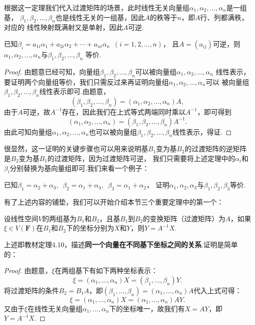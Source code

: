 根据这一定理我们代入过渡矩阵的场景，此时线性无关向量组$\alpha_1,\alpha_2,\ldots,\alpha_n$是一组基，
$\beta_1,\beta_2,\ldots,\beta_n$也是线性无关的一组基，因此$A$的秩等于$n$，即$A$行、列都满秩，对应的
线性映射既满射又是单射，因此$A$可逆.
\begin{theorem}
    已知$\beta_i=a_{1i}\alpha_1+a_{2i}\alpha_2+\cdots+a_{ni}\alpha_n\enspace(i=1,2,\ldots,n)$，
    且$A=(a_{ij})$可逆，则$\alpha_1,\alpha_2,\ldots,\alpha_n$与$\beta_1,\beta_2,\ldots,\beta_n$
    等价.
\end{theorem}
\begin{proof}
    由题意已经可知，向量组$\beta_1,\beta_2,\ldots,\beta_n$可以被向量组$\alpha_1,\alpha_2,\ldots,\alpha_n$
    线性表示，要证明两个向量组等价，我们只需反过来再证明向量组$\alpha_1,\alpha_2,\ldots,\alpha_n$可以
    被向量组$\beta_1,\beta_2,\ldots,\beta_n$线性表示即可.由题意，
    \[(\beta_1,\beta_2,\ldots,\beta_n)=(\alpha_1,\alpha_2,\ldots,\alpha_n)A,\]
    由于$A$可逆，故$A^{-1}$存在，因此我们在上式等式两端同时乘以$A^{-1}$，即可得到
    \[(\alpha_1,\alpha_2,\ldots,\alpha_n)=(\beta_1,\beta_2,\ldots,\beta_n)A^{-1}.\]
    由此可知向量组$\alpha_1,\alpha_2,\ldots,\alpha_n$也可以被向量组$\beta_1,\beta_2,\ldots,\beta_n$线性表示，得证.
\end{proof}

很显然，这一证明的关键步骤也可以用来说明基$B_1$变为基$B_2$的过渡矩阵的逆矩阵是$B_2$变为基$B_1$的过渡矩阵，因为过渡矩阵可逆，
我们只需要将上述定理中的$\alpha_i$和$\beta_i$分别替换为基向量组即可.我们来看一个例子：
\begin{example}
    已知$\beta_1=\alpha_2+\alpha_3,\enspace\beta_2=\alpha_1+\alpha_3,\enspace\beta_3=\alpha_1+\alpha_2$，
    证明$\alpha_1,\alpha_2,\alpha_3$与$\beta_1,\beta_2,\beta_3$等价.
\end{example}
\begin{solution}

\end{solution}

有了上述内容的铺垫，我们可以开始介绍本节三个重要定理中的第一个：
\begin{theorem}[基的选择对向量坐标的影响]
    设线性空间$V$的两组基为$B_1$和$B_2$，且基$B_1$到$B_2$的变换矩阵（过渡矩阵）为$A$，如果
    $\xi \in V(\mathbf{F})$在$B_1$和$B_2$下的坐标分别为$X$和$Y$，则$Y=A^{-1}X$.
\end{theorem}
上述即教材定理4.10，描述\textbf{同一个向量在不同基下坐标之间的关系}.证明是简单的：

\begin{proof}
    由题意，$\xi$在两组基下有如下两种坐标表示：
    \[\xi=(\alpha_1,\ldots,\alpha_n)X=(\beta_1,\ldots,\beta_n)Y.\]
    将过渡矩阵的条件$B_2=B_1A$，即$(\beta_1,\ldots,\beta_n)=(\alpha_1,\ldots,\alpha_n)A$代入上式可得：
    \[\xi=(\alpha_1,\ldots,\alpha_n)X=(\alpha_1,\ldots,\alpha_n)AY.\]
    又由于$\xi$在线性无关向量组$\alpha_1,\ldots,\alpha_n$下的坐标唯一，故我们有$X=AY$，即$Y=A^{-1}X$.
\end{proof}

